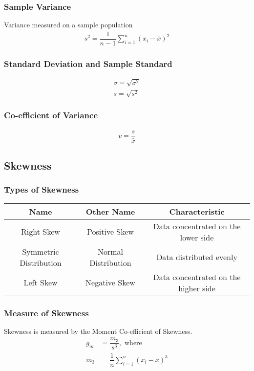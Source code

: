 \documentclass[openany,b5paper]{article}
\begin{document}
\subsubsection{Sample Variance}
Variance measured on a sample population
\begin{align}
s^2 = \dfrac{1}{n-1} \sum_{i=1}^{n} \left( x_i - \bar{x} \right)^2
\end{align}

\subsubsection{Standard Deviation and Sample Standard}
\begin{align}
\sigma = \sqrt{\sigma^2}\\
s=\sqrt{s^2}
\end{align}

\subsubsection{Co-efficient of Variance}
\begin{align}
v = \dfrac{s}{\bar{x}}
\end{align}

\subsection{Skewness}
\subsubsection{Types of Skewness}
\begin{table}[!h]
\centering
\begin{tabular}{c|c|c}
Name & Other Name & Characteristic\\
\hline
Right Skew & Positive Skew & Data concentrated on the lower side\\
Symmetric Distribution & Normal Distribution & Data distributed evenly\\
Left Skew & Negative Skew & Data concentrated on the higher side
\end{tabular}
\end{table}

\subsubsection{Measure of Skewness}
Skewness is measured by the Moment Co-efficient of Skewness.
\begin{align}
g_m &= \dfrac{m_3}{s^3}, \text{ where}\\
m_3 &= \dfrac{1}{n}\sum_{i=1}^{n} \left( x_i - \bar{x} \right)^3
\end{align}
\end{document}
